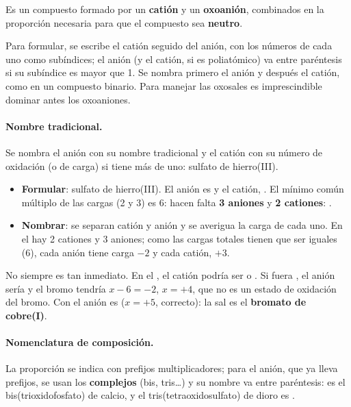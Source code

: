 \begin{definition}[Oxosal]
    Es un compuesto formado por un \textbf{catión} y un \textbf{oxoanión}, combinados en la proporción necesaria para que el
    compuesto sea \textbf{neutro}.
\end{definition}

Para formular, se escribe el catión seguido del anión, con los números de cada uno como subíndices; el anión (y el catión, si es
poliatómico) va entre paréntesis si su subíndice es mayor que 1. Se nombra primero el anión y después el catión, como en un
compuesto binario. Para manejar las oxosales es imprescindible dominar antes los oxoaniones.

\paragraph{Nombre tradicional.} Se nombra el anión con su nombre tradicional y el catión con su número de oxidación (o de
carga) si tiene más de uno: sulfato de hierro(III).
\begin{itemize}
    \item \textbf{Formular}: sulfato de hierro(III). El anión es  y el catión, . El mínimo común múltiplo
    de las cargas (2 y 3) es 6: hacen falta \textbf{3 aniones} y \textbf{2 cationes}: .
    \item \textbf{Nombrar}: se separan catión y anión y se averigua la carga de cada uno. En el  hay 2 cationes y
    3 aniones; como las cargas totales tienen que ser iguales (6), cada anión tiene carga \(-2\) y cada catión, \(+3\).
\end{itemize}

No siempre es tan inmediato. En el , el catión podría ser  o . Si fuera , el anión
sería  y el bromo tendría \(x - 6 = -2\), \(x = +4\), que no es un estado de oxidación del bromo. Con  el
anión es  (\(x = +5\), correcto): la sal es el \textbf{bromato de cobre(I)}.

\paragraph{Nomenclatura de composición.} La proporción se indica con prefijos multiplicadores; para el anión, que ya lleva
prefijos, se usan los \textbf{complejos} (bis, tris…) y su nombre va entre paréntesis:  es el
bis(trioxidofosfato) de calcio, y el tris(tetraoxidosulfato) de dioro es .


